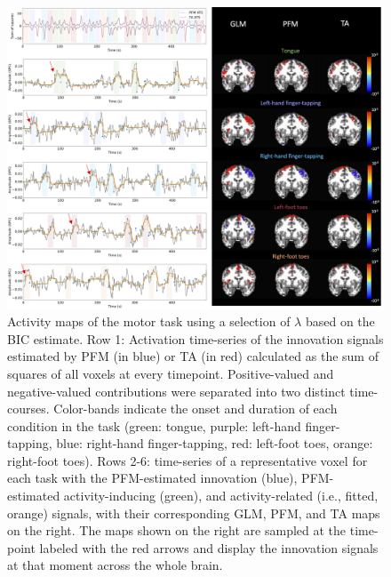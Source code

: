 \begin{figure}[t!]
    \begin{center}
        \includegraphics[width=\textwidth]{figures/task_maps.png}
    \end{center}
    \caption{Activity maps of the motor task using a selection of $\lambda$ based on the BIC estimate. Row 1: Activation time-series of the innovation signals estimated by PFM (in blue) or TA (in red) calculated as the sum of squares of all voxels at every timepoint. Positive-valued and negative-valued contributions were separated into two distinct time-courses. Color-bands indicate the onset and duration of each condition in the task (green: tongue, purple: left-hand finger-tapping, blue: right-hand finger-tapping, red: left-foot toes, orange: right-foot toes). Rows 2-6: time-series of a representative voxel for each task with the PFM-estimated innovation (blue), PFM-estimated activity-inducing (green), and activity-related (i.e., fitted, orange) signals, with their corresponding GLM, PFM, and TA maps on the right. The maps shown on the right are sampled at the time-point labeled with the red arrows and display the innovation signals at that moment across the whole brain.}
\label{fig:task_maps}
\end{figure}

